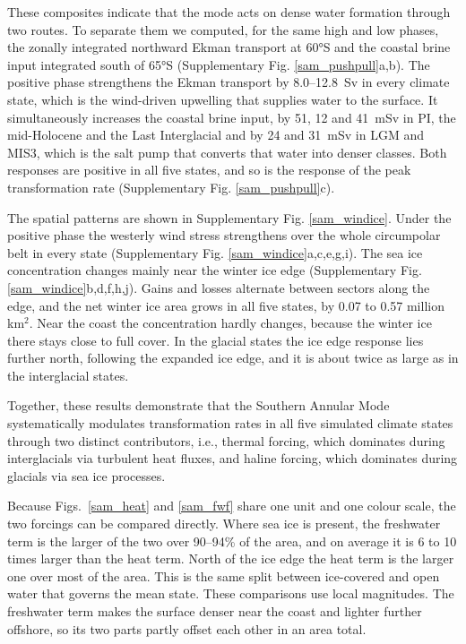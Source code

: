 \documentclass[pdflatex,sn-nature]{sn-jnl}
\begin{document}
These composites indicate that the mode acts on dense water formation through two routes. To separate them we computed, for the same high and low phases, the zonally integrated northward Ekman transport at 60°S and the coastal brine input integrated south of 65°S (Supplementary Fig. \ref{sam_pushpull}a,b). The positive phase strengthens the Ekman transport by 8.0--12.8~Sv in every climate state, which is the wind-driven upwelling that supplies water to the surface. It simultaneously increases the coastal brine input, by 51, 12 and 41~mSv in PI, the mid-Holocene and the Last Interglacial and by 24 and 31~mSv in LGM and MIS3, which is the salt pump that converts that water into denser classes. Both responses are positive in all five states, and so is the response of the peak transformation rate (Supplementary Fig. \ref{sam_pushpull}c).

The spatial patterns are shown in Supplementary Fig. \ref{sam_windice}. Under the positive phase the westerly wind stress strengthens over the whole circumpolar belt in every state (Supplementary Fig. \ref{sam_windice}a,c,e,g,i). The sea ice concentration changes mainly near the winter ice edge (Supplementary Fig. \ref{sam_windice}b,d,f,h,j). Gains and losses alternate between sectors along the edge, and the net winter ice area grows in all five states, by 0.07 to 0.57 million km$^2$. Near the coast the concentration hardly changes, because the winter ice there stays close to full cover. In the glacial states the ice edge response lies further north, following the expanded ice edge, and it is about twice as large as in the interglacial states.

Together, these results demonstrate that the Southern Annular Mode systematically modulates transformation rates in all five simulated climate states through two distinct contributors, i.e., thermal forcing, which dominates during interglacials via turbulent heat fluxes, and haline forcing, which dominates during glacials via sea ice processes.

Because Figs.~\ref{sam_heat} and \ref{sam_fwf} share one unit and one colour scale, the two forcings can be compared directly. Where sea ice is present, the freshwater term is the larger of the two over 90--94\% of the area, and on average it is 6 to 10 times larger than the heat term. North of the ice edge the heat term is the larger one over most of the area. This is the same split between ice-covered and open water that governs the mean state. These comparisons use local magnitudes. The freshwater term makes the surface denser near the coast and lighter further offshore, so its two parts partly offset each other in an area total.
\end{document}
